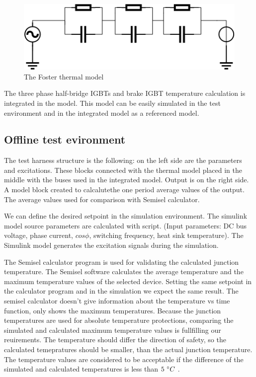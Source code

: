\begin{figure}[!h]
\centering
\includegraphics[width=0.9\columnwidth]{figures/foster.png}
\caption{The Foster thermal model}
\label{fig:foster}
\end{figure}

The three phase half-bridge IGBTs and brake IGBT temperature calculation is integrated in the model. This model can be easily simulated in the test environment and in the integrated model as a referenced model.

\subsection{Offline test evironment}

The test harness structure is the following: on the left side are the parameters and excitations. These blocks connected with the thermal model placed in the middle with the buses used in the integrated model. Output is on the right side. A model block created to calcalutethe one period average values of the output. The average values used for comparison with Semisel calculator.

We can define the desired setpoint in the simulation environment. The simulink model source parameters are calculated with script. (Input parameters: DC bus voltage, phase current, $cos\phi{}$, switching frequency, heat sink temperature). The Simulink model generates the excitation signals during the simulation.

The Semisel calculator program is used for validating the calculated junction temperature. The Semisel software calculates the average temperature and the maximum temperature values of the selected device. Setting the same setpoint in the calculator program and in the simulation we expect the same result. The  semisel calculator doesn’t give information about the temperature vs time function, only shows the maximum temperatures. Because the junction temperatures are used for absolute temperature protections, comparing the simulated and calculated maximum temperature values is fullfilling our reuirements. The temperature should differ the direction of safety, so the calculated temepratures should be smaller, than the actual junction temperature. The temperature values are considered to be acceptable if the difference of the simulated and calculated temperatures is less than $5\ \degree{}C$ .

